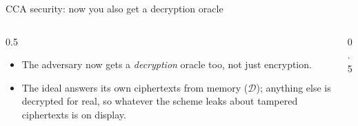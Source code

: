 \ifdefined\PRESENTATION\else\PassOptionsToClass{handout}{beamer}\fi\documentclass[aspectratio=169, lualatex]{beamer}
\begin{document}
\begin{frame}{CCA security: now you also get a decryption oracle}
	\begin{columns}[c]
		\begin{column}{0.5\textwidth}
			\begin{itemize}
				\item The adversary now gets a \emph{decryption} oracle too, not just encryption.
				\item The ideal  answers its own ciphertexts from memory ($\mathcal{D}$); anything else is decrypted for real, so whatever the scheme leaks about tampered ciphertexts is on display.
			\end{itemize}
		\end{column}
		\begin{column}{0.5\textwidth}
		\end{column}
	\end{columns}
\end{frame}
\end{document}
